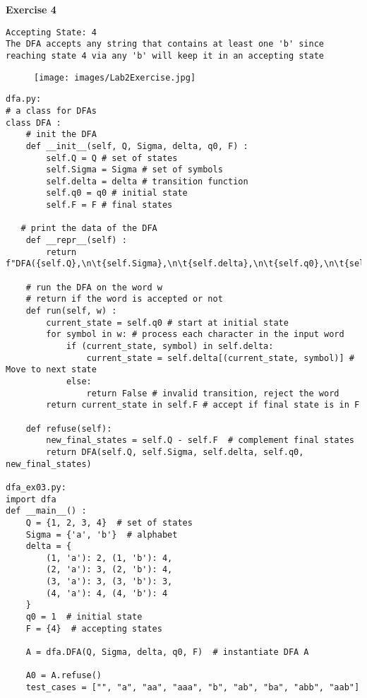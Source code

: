 \documentclass{article}
\theoremstyle{theorem}
\theoremstyle{definition}
\theoremstyle{remark}
\begin{document}
\textbf{Exercise 4} 
\begin{lstlisting}
Accepting State: 4
The DFA accepts any string that contains at least one 'b' since reaching state 4 via any 'b' will keep it in an accepting state
\end{lstlisting}

\begin{figure}[h] %
    \centering
    \texttt{[image: images/Lab2Exercise.jpg]} %
    \caption{}
\end{figure}

\begin{lstlisting}
dfa.py:
# a class for DFAs
class DFA :
    # init the DFA
    def __init__(self, Q, Sigma, delta, q0, F) : 
        self.Q = Q # set of states
        self.Sigma = Sigma # set of symbols
        self.delta = delta # transition function
        self.q0 = q0 # initial state
        self.F = F # final states
   
   # print the data of the DFA
    def __repr__(self) :
        return f"DFA({self.Q},\n\t{self.Sigma},\n\t{self.delta},\n\t{self.q0},\n\t{self.F})"

    # run the DFA on the word w
    # return if the word is accepted or not
    def run(self, w) :
        current_state = self.q0 # start at initial state
        for symbol in w: # process each character in the input word
            if (current_state, symbol) in self.delta:
                current_state = self.delta[(current_state, symbol)] # Move to next state
            else:
                return False # invalid transition, reject the word
        return current_state in self.F # accept if final state is in F       

    def refuse(self):
        new_final_states = self.Q - self.F  # complement final states
        return DFA(self.Q, self.Sigma, self.delta, self.q0, new_final_states)

dfa_ex03.py:
import dfa
def __main__() :
    Q = {1, 2, 3, 4}  # set of states
    Sigma = {'a', 'b'}  # alphabet
    delta = {
        (1, 'a'): 2, (1, 'b'): 4,
        (2, 'a'): 3, (2, 'b'): 4,
        (3, 'a'): 3, (3, 'b'): 3,
        (4, 'a'): 4, (4, 'b'): 4
    }
    q0 = 1  # initial state
    F = {4}  # accepting states

    A = dfa.DFA(Q, Sigma, delta, q0, F)  # instantiate DFA A
    
    A0 = A.refuse()
    test_cases = ["", "a", "aa", "aaa", "b", "ab", "ba", "abb", "aab"]
    

\end{lstlisting}
\end{document}

